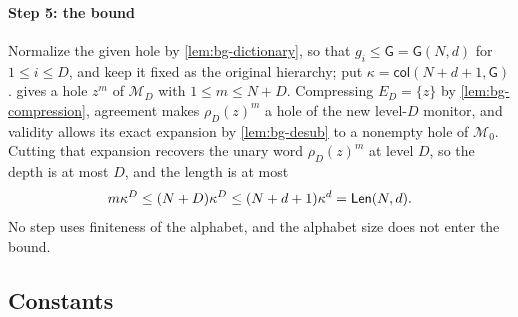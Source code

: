 \paragraph{Step 5: the bound}
Normalize the given hole by \cref{lem:bg-dictionary}, so that $g_i\le
\mathsf G=\mathsf G(N,d)$ for $1\le i\le D$, and keep it fixed as the original
hierarchy; put $\kappa=\mathsf{col}(N+d+1,\mathsf G)$.  gives
a hole $z^m$ of $\mathcal M_D$ with $1\le m\le N+D$. Compressing $E_D=\{z\}$ by
\cref{lem:bg-compression}, agreement makes $\rho_D(z)^m$ a hole of the new
level-$D$ monitor, and validity allows its exact expansion by
\cref{lem:bg-desub} to a nonempty hole of $\mathcal M_0$. Cutting that expansion
recovers the unary word $\rho_D(z)^m$ at level $D$, so the depth is at most $D$,
and the length is at most
\[
 m\kappa^D\le(N+D)\kappa^D\le(N+d+1)\kappa^d=\mathsf{Len}(N,d).
\]
No step uses finiteness of the alphabet, and the alphabet size does not enter
the bound.

\subsection{Constants}\label{app:bg-constants}

